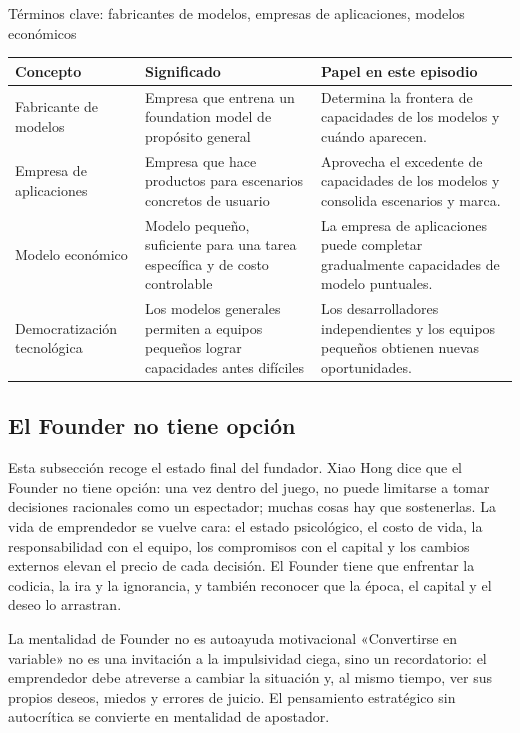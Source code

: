 \documentclass[a4paper]{article}
\begin{document}
\begin{knowledgebox}{Términos clave: fabricantes de modelos, empresas de aplicaciones, modelos económicos}
\noindent\begin{tabularx}{\textwidth}{p{}p{}X}
\toprule
Concepto & Significado & Papel en este episodio \\
\midrule
Fabricante de modelos & Empresa que entrena un foundation model de propósito general & Determina la frontera de capacidades de los modelos y cuándo aparecen. \\
Empresa de aplicaciones & Empresa que hace productos para escenarios concretos de usuario & Aprovecha el excedente de capacidades de los modelos y consolida escenarios y marca. \\
Modelo económico & Modelo pequeño, suficiente para una tarea específica y de costo controlable & La empresa de aplicaciones puede completar gradualmente capacidades de modelo puntuales. \\
Democratización tecnológica & Los modelos generales permiten a equipos pequeños lograr capacidades antes difíciles & Los desarrolladores independientes y los equipos pequeños obtienen nuevas oportunidades. \\
\bottomrule
\end{tabularx}
\end{knowledgebox}

\subsection{El Founder no tiene opción}

Esta subsección recoge el estado final del fundador. Xiao Hong dice que el Founder no tiene opción: una vez dentro del juego, no puede limitarse a tomar decisiones racionales como un espectador; muchas cosas hay que sostenerlas. La vida de emprendedor se vuelve cara: el estado psicológico, el costo de vida, la responsabilidad con el equipo, los compromisos con el capital y los cambios externos elevan el precio de cada decisión. El Founder tiene que enfrentar la codicia, la ira y la ignorancia, y también reconocer que la época, el capital y el deseo lo arrastran.

\begin{warningbox}{La mentalidad de Founder no es autoayuda motivacional}
«Convertirse en variable» no es una invitación a la impulsividad ciega, sino un recordatorio: el emprendedor debe atreverse a cambiar la situación y, al mismo tiempo, ver sus propios deseos, miedos y errores de juicio. El pensamiento estratégico sin autocrítica se convierte en mentalidad de apostador.
\end{warningbox}
\end{document}
